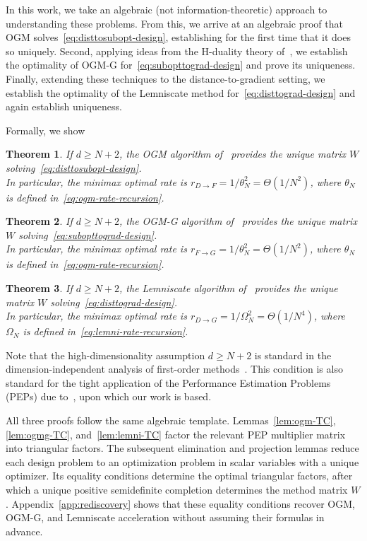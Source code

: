 \documentclass[11pt]{article}
\newtheorem{theorem}{Theorem}[section]
\begin{document}
In this work, we take an algebraic (not information-theoretic) approach to understanding these problems. From this, we arrive at an algebraic proof that OGM solves~\eqref{eq:disttosubopt-design}, establishing for the first time that it does so uniquely. Second, applying ideas from the H-duality theory of~\cite{KOPR23}, we establish the optimality of OGM-G for~\eqref{eq:subopttograd-design} and prove its uniqueness. Finally, extending these techniques to the distance-to-gradient setting, we establish the optimality of the Lemniscate method for~\eqref{eq:disttograd-design} and again establish uniqueness.

Formally, we show
\begin{theorem}\label{thm:disttosubopt}
    If $d\geq N+2$, the OGM algorithm of~\cite{KF16} provides the unique matrix $W$ solving~\eqref{eq:disttosubopt-design}.\\
    In particular, the minimax optimal rate is $r_{D\rightarrow F} = 1/\theta_N^2 = \Theta(1/N^2)$, where $\theta_N$ is defined in~\eqref{eq:ogm-rate-recursion}.
\end{theorem}
\begin{theorem}\label{thm:subopttograd}
    If $d\geq N+2$, the OGM-G algorithm of~\cite{KF21} provides the unique matrix $W$ solving~\eqref{eq:subopttograd-design}.\\
    In particular, the minimax optimal rate is $r_{F\rightarrow G} = 1/\theta_N^2 = \Theta(1/N^2)$, where $\theta_N$ is defined in~\eqref{eq:ogm-rate-recursion}.
\end{theorem}
\begin{theorem}\label{thm:disttograd}
    If $d\geq N+2$, the Lemniscate algorithm of~\cite{KimRyuDasGupta26} provides the unique matrix $W$ solving~\eqref{eq:disttograd-design}.\\
    In particular, the minimax optimal rate is $r_{D\rightarrow G} = 1/\Omega_N^2 = \Theta(1/N^4)$, where $\Omega_N$ is defined in~\eqref{eq:lemni-rate-recursion}.
\end{theorem}
\noindent Note that the high-dimensionality assumption $d\geq N+2$ is standard in the dimension-independent analysis of first-order methods~\cite{nemirovsky1983problem}. This condition is also standard for the tight application of the Performance Estimation Problems (PEPs) due to~\cite{DT14,THG17,taylor2017composite}, upon which our work is based.

All three proofs follow the same algebraic template. Lemmas~\ref{lem:ogm-TC}, \ref{lem:ogmg-TC}, and~\ref{lem:lemni-TC}  factor the relevant PEP multiplier matrix into triangular factors. The subsequent elimination and projection lemmas reduce each design problem to an optimization problem in scalar variables with a unique optimizer. Its equality conditions determine the optimal triangular factors, after which a unique positive semidefinite completion determines the method matrix $W$. Appendix~\ref{app:rediscovery} shows that these equality conditions recover OGM, OGM-G, and Lemniscate acceleration without assuming their formulas in advance.
\end{document}

